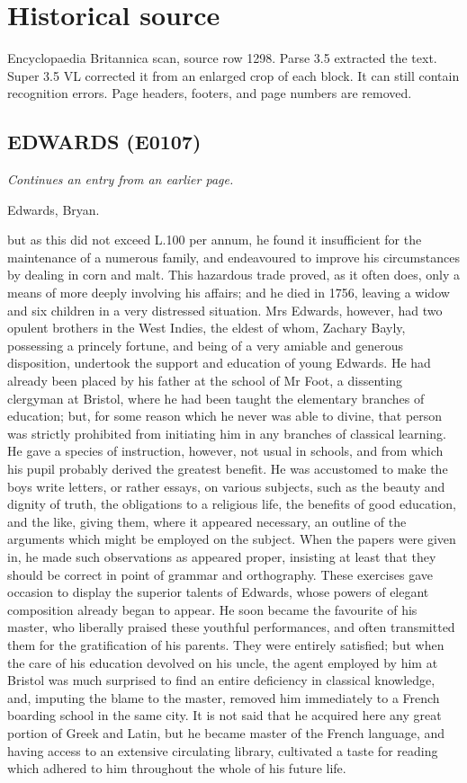 \documentclass{article}
\begin{document}
\section*{Historical source}
Encyclopaedia Britannica scan, source row 1298. Parse 3.5 extracted the text. Super 3.5 VL corrected it from an enlarged crop of each block. It can still contain recognition errors.
Page headers, footers, and page numbers are removed.

\subsection*{EDWARDS (E0107)}
\textit{Continues an entry from an earlier page.}

Edwards, Bryan.

but as this did not exceed L.100 per annum, he found it insufficient for the maintenance of a numerous family, and endeavoured to improve his circumstances by dealing in corn and malt. This hazardous trade proved, as it often does, only a means of more deeply involving his affairs; and he died in 1756, leaving a widow and six children in a very distressed situation. Mrs Edwards, however, had two opulent brothers in the West Indies, the eldest of whom, Zachary Bayly, possessing a princely fortune, and being of a very amiable and generous disposition, undertook the support and education of young Edwards. He had already been placed by his father at the school of Mr Foot, a dissenting clergyman at Bristol, where he had been taught the elementary branches of education; but, for some reason which he never was able to divine, that person was strictly prohibited from initiating him in any branches of classical learning. He gave a species of instruction, however, not usual in schools, and from which his pupil probably derived the greatest benefit. He was accustomed to make the boys write letters, or rather essays, on various subjects, such as the beauty and dignity of truth, the obligations to a religious life, the benefits of good education, and the like, giving them, where it appeared necessary, an outline of the arguments which might be employed on the subject. When the papers were given in, he made such observations as appeared proper, insisting at least that they should be correct in point of grammar and orthography. These exercises gave occasion to display the superior talents of Edwards, whose powers of elegant composition already began to appear. He soon became the favourite of his master, who liberally praised these youthful performances, and often transmitted them for the gratification of his parents. They were entirely satisfied; but when the care of his education devolved on his uncle, the agent employed by him at Bristol was much surprised to find an entire deficiency in classical knowledge, and, imputing the blame to the master, removed him immediately to a French boarding school in the same city. It is not said that he acquired here any great portion of Greek and Latin, but he became master of the French language, and having access to an extensive circulating library, cultivated a taste for reading which adhered to him throughout the whole of his future life.
\end{document}
